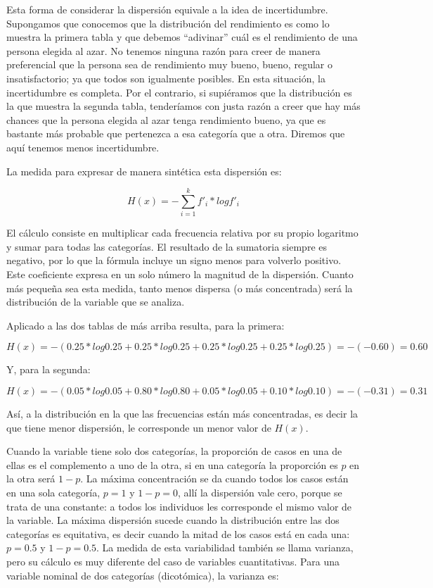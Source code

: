 \documentclass[]{book}
\begin{document}
Esta forma de considerar la dispersión equivale a la idea de
incertidumbre. Supongamos que conocemos que la distribución del
rendimiento es como lo muestra la primera tabla y que debemos ``adivinar''
cuál es el rendimiento de una persona elegida al azar. No tenemos
ninguna razón para creer de manera preferencial que la persona sea de
rendimiento muy bueno, bueno, regular o insatisfactorio; ya que todos
son igualmente posibles. En esta situación, la incertidumbre es
completa. Por el contrario, si supiéramos que la distribución es la que
muestra la segunda tabla, tenderíamos con justa razón a creer que hay
más chances que la persona elegida al azar tenga rendimiento bueno, ya
que es bastante más probable que pertenezca a esa categoría que a otra.
Diremos que aquí tenemos menos incertidumbre.

La medida para expresar de manera sintética esta dispersión es:

\[H\left( x \right) = - \sum_{i = 1}^{k}{{f'}_{i}^{}*log{f'}_{i}^{}}\]

El cálculo consiste en multiplicar cada frecuencia relativa por su
propio logaritmo y sumar para todas las categorías. El resultado de la
sumatoria siempre es negativo, por lo que la fórmula incluye un signo
menos para volverlo positivo. Este coeficiente expresa en un solo número
la magnitud de la dispersión. Cuanto más pequeña sea esta medida, tanto
menos dispersa (o más concentrada) será la distribución de la variable
que se analiza.

Aplicado a las dos tablas de más arriba resulta, para la primera:

\[H\left( x \right) = - (0.25*log0.25 + 0.25*log0.25 + 0.25*log0.25 + 0.25*log0.25) = - \left( - 0.60 \right) = 0.60\]

Y, para la segunda:

\[H\left( x \right) = - (0.05*log0.05 + 0.80*log0.80 + 0.05*log0.05 + 0.10*log0.10) = - \left( - 0.31 \right) = 0.31\]

Así, a la distribución en la que las frecuencias están más concentradas,
es decir la que tiene menor dispersión, le corresponde un menor valor de \(H(x)\).

Cuando la variable tiene solo dos categorías, la proporción de casos en una de ellas es el complemento a uno de la otra, si en una categoría la proporción es \(p\) en la otra será \(1-p\). La máxima concentración se da cuando todos los casos están en una sola categoría, \(p=1\) y \(1-p=0\), allí la dispersión vale cero, porque se trata de una constante: a todos los individuos les corresponde el mismo valor de la variable. La máxima dispersión sucede cuando la distribución entre las dos categorías es equitativa, es decir cuando la mitad de los casos está en cada una: \(p=0.5\) y \(1-p=0.5\).
La medida de esta variabilidad también se llama varianza, pero su cálculo es muy diferente del caso de variables cuantitativas. Para una variable nominal de dos categorías (dicotómica), la varianza es:
\end{document}
